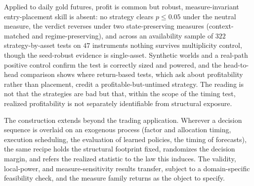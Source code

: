\documentclass[risks,article,submit,pdftex,oneauthor]{Definitions/mdpi}
\begin{document}
Applied to daily gold futures, profit is common but
robust, measure-invariant entry-placement skill is absent: no strategy clears
$p\le0.05$ under the neutral measure, the verdict reverses under two state-preserving measures (context-matched and regime-preserving), and across an availability sample of $322$ strategy-by-asset tests on $47$ instruments
nothing survives multiplicity control, though the seed-robust evidence is single-asset. Synthetic worlds and a real-path positive control
confirm the test is correctly sized and powered, and the head-to-head comparison
shows where return-based tests, which ask about profitability rather than placement,
credit a profitable-but-untimed strategy. The reading is not that the strategies are
bad but that, within the scope of the timing test, realized profitability is not
separately identifiable from structural exposure.

The construction extends beyond the trading application. Wherever a decision sequence is overlaid on an
exogenous process (factor and allocation timing, execution scheduling, the
evaluation of learned policies, the timing of forecasts), the same recipe holds
the structural footprint fixed, randomizes the decision margin, and refers the
realized statistic to the law this induces. The validity, local-power, and
measure-sensitivity results transfer, subject to a domain-specific feasibility check, and the
measure family returns as the object to specify.




\end{document}
